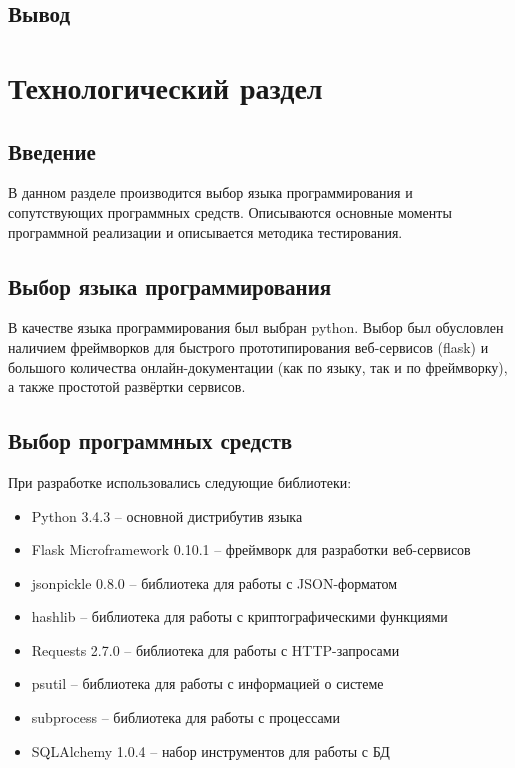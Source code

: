 \documentclass[a4paper,12pt]{report}
\numberwithin{equation}{section}
\begin{document}
  \subsection{Вывод}
  
  \clearpage
  \section{Технологический раздел}
  \subsection{Введение}
  В данном разделе производится выбор языка программирования и сопутствующих программных средств. 
  Описываются основные моменты программной реализации и описывается методика тестирования.
  
  \subsection{Выбор языка программирования}
  В качестве языка программирования был выбран python. Выбор был обусловлен наличием фреймворков для быстрого прототипирования веб-сервисов (flask) и большого количества онлайн-документации (как по языку, так и по фреймворку), а также простотой развёртки сервисов.
  
  \subsection{Выбор программных средств}
  При разработке использовались следующие библиотеки:
  \begin{itemize}
    \item Python 3.4.3 \cite{python} -- основной дистрибутив языка
    \item Flask Microframework 0.10.1 \cite{flask} -- фреймворк для разработки веб-сервисов
    \item jsonpickle 0.8.0 \cite{jsonpickle} -- библиотека для работы с JSON-форматом
    \item hashlib \cite{hashlib} -- библиотека для работы с криптографическими функциями
    \item Requests 2.7.0 \cite{requests} -- библиотека для работы с HTTP-запросами
    \item psutil \cite{psutil} -- библиотека для работы с информацией о системе
    \item subprocess \cite{subprocess} -- библиотека для работы с процессами
    \item SQLAlchemy 1.0.4 \cite{sqlalchemy} -- набор инструментов для работы с БД
  \end{itemize}  
  
\end{document}
